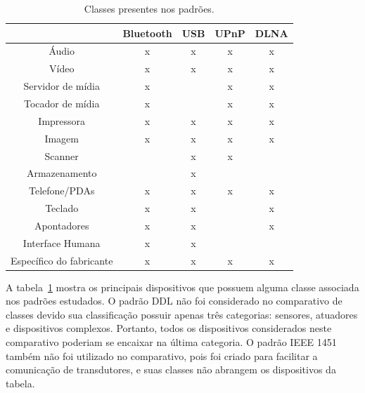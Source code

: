 \begin{table}
	\caption{Classes presentes nos padrões.}
	\begin{center}
		\begin{tabular}{|ccccc|}
		\hline
									& \textbf{Bluetooth} 	& \textbf{USB}	& \textbf{UPnP} & \textbf{DLNA}	\\
		\hline
		Áudio						& x						& x				& x 			& x				\\
		\hline
		Vídeo						& x						& x				& x				& x				\\
		\hline
		Servidor de mídia			& x						&				& x 			& x				\\
		\hline
		Tocador de mídia			& x						&				& x				& x				\\
		\hline
		Impressora 					& x						& x				& x				& x				\\
		\hline
		Imagem	 					& x						& x				& x				& x				\\
		\hline
		Scanner						& 						& x				& x				& 				\\
		\hline
		Armazenamento				&						& x				& 				& 				\\	
		\hline
		Telefone/PDAs				& x						& x				& x				& x				\\
		\hline
		Teclado						& x						& x				& 				& x				\\
		\hline
		Apontadores					& x						& x				& 				& x 			\\
		\hline
		Interface Humana		 	& x						& x				&  				&  				\\
		\hline
		Específico do fabricante 	& x 					& x				& x				& x				\\
		\hline								
		\end{tabular}
	\end{center}
	\label{tab:comparativoClasses}
\end{table}

A tabela~\ref{tab:comparativoClasses} mostra os principais dispositivos que possuem alguma classe associada nos padrões estudados. O padrão DDL não foi considerado no comparativo de classes devido sua classificação possuir apenas três categorias: sensores, atuadores e dispositivos complexos. Portanto, todos os dispositivos considerados neste comparativo poderiam se encaixar na última categoria. O padrão IEEE 1451 também não foi utilizado no comparativo, pois foi criado para facilitar a comunicação de transdutores, e suas classes não abrangem os dispositivos da tabela.
